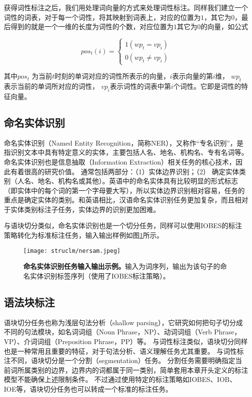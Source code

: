 获得词性标注之后，我们用处理词向量的方式来处理词性标注。同样我们建立一个词性的词表，对于每一个词性，将其映射到词表上，对应的位置为$1$，其它为$0$，最后得到的就是一个一维的长度为词性的个数，对应位置为$1$其它为$0$的向量，如公式

\begin{equation}
    {pos_t}(i)=\left\{  
             \begin{array}{lr}  
             1  ({wp_t} = {vp_i}) \\
             0  ({wp_t} \not= {vp_i}) 
             \end{array}  
	\right.  
\end{equation}

其中${pos_t}$ 为当前$t$时刻的单词对应的词性所表示的向量，$i$表示向量的第$i$维， ${wp_t}$表示当前的单词所对应的词性， ${vp_i}$表示词性的词表中第$i$个词性。它即是词性的特征向量。

\subsection{命名实体识别} 
命名实体识别（Named Entity Recognition，简称NER），又称作“专名识别”，是指识别文本中具有特定意义的实体，主要包括人名、地名、机构名、专有名词等。
命名实体识别也是信息抽取（Information Extraction）相关任务的核心技术，因此有着很高的研究价值。
通常包括两部分：（1）实体边界识别；（2） 确定实体类别（人名、地名、机构名或其他）。英语中的命名实体具有比较明显的形式标志（即实体中的每个词的第一个字母要大写），所以实体边界识别相对容易，任务的重点是确定实体的类别。和英语相比，汉语命名实体识别任务更加复杂，而且相对于实体类别标注子任务，实体边界的识别更加困难。


与语块切分类似，命名实体识别也是一个切分任务，同样可以使用IOBES的标注策略转化为标准标注任务，输入输出样例如图\ref{fig:nersample}所示。

\begin{figure}[tbhp!]
\small
\centering
\texttt{[image: struclm/nersam.jpeg]}
%
\caption[命名实体识别任务输入输出示例]{\textbf{命名实体识别任务输入输出示例。}输入为词序列，输出为该句子的命名实体识别标签序列（使用了IOBES标注策略）。}\label{fig:nersample}
\end{figure}



\subsection{语法块标注} 
语块切分任务也称为浅层句法分析（shallow parsing），它研究如何把句子切分成不同的句法模块，如名词词组（Noun Phrase，NP）、动词词组（Verb Phrase，VP）、介词词组（Preposition Phrase，PP）等。
与词性标注类似，语块切分同样也是一种常用且重要的特征，对于句法分析、语义理解任务尤其重要。
与词性标注不同，语块切分是一个分割（segmentation）任务。
分割任务需要明确指定当前词所属类别的边界，边界内的词都属于同一类别，简单套用本章开头定义的标注模型不能确保上述限制条件。
不过通过使用特定的标注策略如IOBES、IOB、IOE等，语块切分任务也可以转成一个标准的标注任务。

